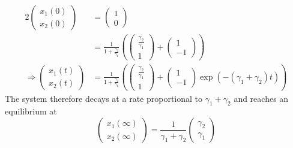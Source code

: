 \begin{alignat}{2}
    \begin{pmatrix}
        x_1(0) \\
        x_2(0)
    \end{pmatrix}              & =\begin{pmatrix}
        1 \\
        0
    \end{pmatrix} \\
                                           & =
    \frac{1}{1 + \frac{\gamma_2}{\gamma_1}}(\begin{pmatrix}
        \frac{\gamma_2}{\gamma_1} \\
        1
    \end{pmatrix} +
    \begin{pmatrix}
        1 \\
        -1
    \end{pmatrix})                                          \\
    \Rightarrow \begin{pmatrix}
        x_1(t) \\
        x_2(t)
    \end{pmatrix} & =
    \frac{1}{1 + \frac{\gamma_2}{\gamma_1}}(\begin{pmatrix}
        \frac{\gamma_2}{\gamma_1} \\
        1
    \end{pmatrix} +
    \begin{pmatrix}
        1 \\
        -1
    \end{pmatrix}\exp{(-(\gamma_1 + \gamma_2)t)})
\end{alignat}
The system therefore decays at a rate
proportional to \(\gamma_1 + \gamma_2\)
and reaches an equilibrium at
\begin{equation}
    \begin{pmatrix}
        x_1(\infty) \\
        x_2(\infty)
    \end{pmatrix}  =\frac{1}{\gamma_1 + \gamma_2} \begin{pmatrix}
        \gamma_2 \\
        \gamma_1
    \end{pmatrix}
\end{equation}
